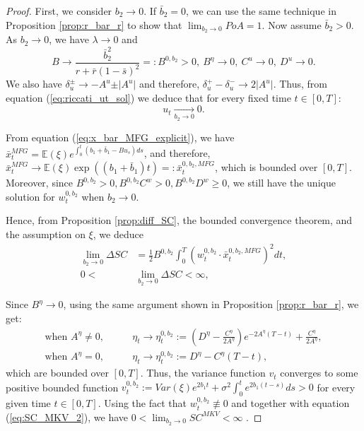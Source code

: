 \documentclass[11pt]{article}
\begin{document}
\begin{proof}
    First, we consider $b_2 \to 0$. If $\bar{b}_2 =0$, we can use the same technique in Proposition \ref{prop:r_bar_r} to show that $\lim_{b_2 \to 0} PoA = 1$. Now assume $\bar{b}_2 > 0$.
    As $b_2 \to 0$, we have $\lambda \to 0 $ and
	$$ B \to \frac{\bar{b}_2^2}{r + \bar{r}(1-\bar{s})^2}=:B^{0,b_2} >0,\ B^{\eta} \to 0,\ C^u \to 0,\ D^u \to 0.$$
	We also have $\delta^\pm_u \to -A^u \pm \vert A^u \vert $ and therefore, $\delta^{+}_u - \delta^{-}_u \to 2 \vert A^u \vert $. Thus, from equation (\ref{eq:riccati_ut_sol}) we deduce that for every fixed time $t \in [0,T]$:
	$$u_t \xrightarrow[b_2 \to 0 ]{} 0.$$
	
	From equation (\ref{eq:x_bar_MFG_explicit}), we have $\bar{x}_t^{MFG}=\mathbb{E}(\xi) e^{\int_0^t(b_1+\bar{b}_1-Bu_s)ds}$, and therefore, $\bar{x}_t^{MFG} \to \mathbb{E}(\xi) \exp((b_1+\bar{b}_1)t) =: \bar{x}_t^{0,b_2,MFG}$, which is bounded over $[0,T]$. Moreover, since $B^{0,b_2}>0, B^{0,b_2}C^w >0, B^{0,b_2}D^w \geq 0$, we still have the unique solution for $w^{0,b_2}_t$ when $b_2 \to 0$.
		
	Hence, from Proposition \ref{prop:diff_SC}, the bounded convergence theorem, and the assumption on $\xi$, we deduce
	\begin{equation*}
	\begin{split}
	\lim_{b_2 \to 0} \Delta SC &= \frac{1}{2} B^{0,b_2} \int_0^T (w_t^{0,b_2} \cdot \bar{x}_t^{0,b_2,MFG})^2 dt,\\
	0<&\lim_{b_2 \to 0} \Delta SC < \infty,
	\end{split}
	\end{equation*}
	
	Since $B^{\eta} \to 0$, using the same argument shown in Proposition \ref{prop:r_bar_r}, we get:
	\begin{equation*}
	\begin{split}
	    \text{when } A^\eta \neq 0, \qquad & \eta_t \to \eta^{0,b_2}_t := \left(D^{\eta} - \frac{C^{\eta}}{2A^\eta}\right) e^{-2A^\eta(T-t)} + \frac{C^\eta}{2A^{\eta} },\\
	    \text{when } A^{\eta} = 0, \qquad & \eta_t \to \eta^{0,b_2}_t := D^{\eta} - C^{\eta}(T-t),
	\end{split}
	\end{equation*}
	which are bounded over $[0,T]$. Thus, the variance function $ v_t $ converges to some positive bounded function $ v^{0,b_2}_t := Var(\xi)e^{2b_1t}+ \sigma^2 \int_0^t e^{2b_1(t-s)}ds>0$ for every given time $t\in [0,T]$.
	Using the fact that $w^{0,b_2}_t\not \equiv 0$  and together with equation (\ref{eq:SC_MKV_2}), we have $0< \lim_{b_2\to 0} SC^{MKV} <\infty $ .
	

\end{proof}
\end{document}
